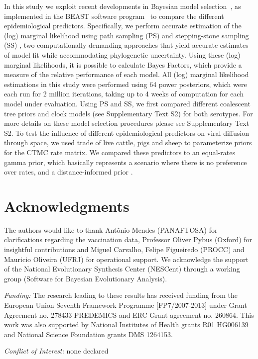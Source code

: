 \documentclass[10pt]{article}
\begin{document}
In this study we exploit recent developments in Bayesian model selection~\cite{Baele2012,Baele2013a,Baele2013b}, as implemented in the BEAST software program~\cite{beast2012} to compare the different epidemiological predictors.
Specifically, we perform accurate estimation of the (log) marginal likelihood using path sampling (PS) \cite{LartillotPhilippe} and stepping-stone sampling (SS) \cite{Xie}, two computationally demanding approaches that yield accurate estimates of model fit while accommodating phylogenetic uncertainty.
Using these (log) marginal likelihoods, it is possible to calculate Bayes Factors, which provide a measure of the relative performance of each model. 
All (log) marginal likelihood estimations in this study were performed using 64 power posteriors, which were each run for 2 million iterations, taking up to 4 weeks of computation for each model under evaluation. 
Using PS and SS, we first compared different coalescent tree priors and clock models (see Supplementary Text S2) for both serotypes. 
For more details on these model selection procedures please see Supplementary Text S2.
To test the influence of different epidemiological predictors on viral diffusion through space, we used trade of live cattle, pigs and sheep to parameterize priors for the CTMC rate matrix.
We compared these predictors to an equal-rates gamma prior, which basically represents a scenario where there is no preference over rates, and a distance-informed prior \cite{roots}.

\section*{Acknowledgments}
The authors would like to thank Ant\^onio Mendes (PANAFTOSA) for clarifications regarding the vaccination data, Professor Oliver Pybus (Oxford) for insightful contributions and Miguel Carvalho, Felipe Figueiredo (PROCC) and Mauricio Oliveira (UFRJ) for operational support.
We acknowledge the support of the National Evolutionary Synthesis Center (NESCent) through a working group (Software for Bayesian Evolutionary Analysis).

\emph{Funding:} The research leading to these results has received funding from the European Union Seventh Framework Programme [FP7/2007-2013] under Grant Agreement no. 278433-PREDEMICS and ERC Grant agreement no. 260864.
This work was also supported by National Institutes of Health grants R01 HG006139 and National Science Foundation grants DMS 1264153.

\emph{Conflict of Interest:} none declared
\end{document}
